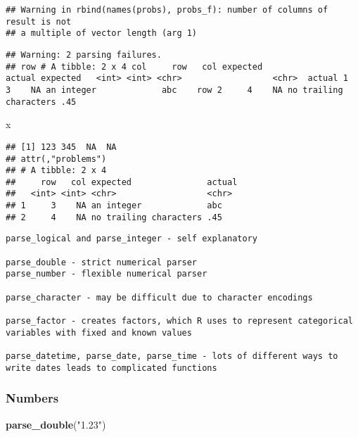 \documentclass[]{article}
\newenvironment{Shaded}{\begin{snugshade}}{\end{snugshade}}
\newcommand{\KeywordTok}[1]{\textcolor[rgb]{0.13,0.29,0.53}{\textbf{#1}}}
\newcommand{\StringTok}[1]{\textcolor[rgb]{0.31,0.60,0.02}{#1}}
\newcommand{\NormalTok}[1]{#1}
\begin{document}
\begin{verbatim}
## Warning in rbind(names(probs), probs_f): number of columns of result is not
## a multiple of vector length (arg 1)
\end{verbatim}

\begin{verbatim}
## Warning: 2 parsing failures.
## row # A tibble: 2 x 4 col     row   col expected               actual expected   <int> <int> <chr>                  <chr>  actual 1     3    NA an integer             abc    row 2     4    NA no trailing characters .45
\end{verbatim}

\begin{Shaded}
\begin{Highlighting}[]
\NormalTok{x}
\end{Highlighting}
\end{Shaded}

\begin{verbatim}
## [1] 123 345  NA  NA
## attr(,"problems")
## # A tibble: 2 x 4
##     row   col expected               actual
##   <int> <int> <chr>                  <chr> 
## 1     3    NA an integer             abc   
## 2     4    NA no trailing characters .45
\end{verbatim}

\begin{verbatim}
parse_logical and parse_integer - self explanatory

parse_double - strict numerical parser
parse_number - flexible numerical parser

parse_character - may be difficult due to character encodings

parse_factor - creates factors, which R uses to represent categorical variables with fixed and known values

parse_datetime, parse_date, parse_time - lots of different ways to write dates leads to complicated functions
\end{verbatim}

\subsubsection{Numbers}\label{numbers}

\begin{Shaded}
\begin{Highlighting}[]
\KeywordTok{parse_double}\NormalTok{(}\StringTok{"1.23"}\NormalTok{)}
\end{Highlighting}
\end{Shaded}
\end{document}
